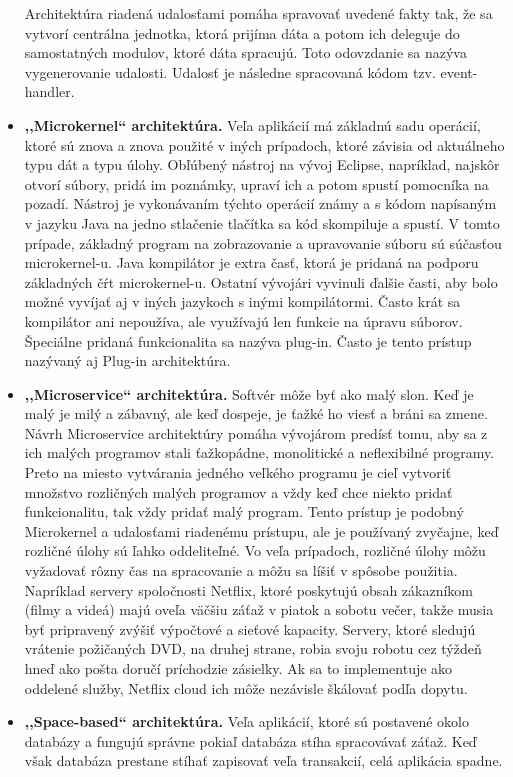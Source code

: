 \begin{itemize}
\indent Architektúra riadená udalosťami pomáha spravovať uvedené fakty tak, že sa vytvorí centrálna jednotka, ktorá prijíma dáta a potom ich deleguje do samostatných modulov, ktoré dáta spracujú. Toto odovzdanie sa nazýva vygenerovanie udalosti. Udalosť je následne spracovaná kódom tzv. event-handler.
 \item \textbf{ ,,Microkernel`` architektúra.} Veľa aplikácií má základnú sadu operácií, ktoré sú znova a znova použité v iných prípadoch, ktoré závisia od aktuálneho typu dát a typu úlohy. Obľúbený nástroj na vývoj Eclipse, napríklad, najskôr otvorí súbory, pridá im poznámky, upraví ich a potom spustí pomocníka na pozadí. Nástroj je vykonávaním týchto operácií známy a s kódom napísaným v jazyku Java na jedno stlačenie tlačítka sa kód skompiluje a spustí.
\indent V tomto prípade, základný program na zobrazovanie a upravovanie súboru sú súčasťou microkernel-u. Java kompilátor je extra časť, ktorá je pridaná na podporu základných čŕt microkernel-u. Ostatní vývojári vyvinuli ďalšie časti, aby bolo možné vyvíjať aj v iných jazykoch s inými kompilátormi. Často krát sa kompilátor ani nepoužíva, ale využívajú len funkcie na úpravu súborov. 
\indent Špeciálne pridaná funkcionalita sa nazýva plug-in. Často je tento prístup nazývaný aj Plug-in architektúra.
 \item \textbf{ ,,Microservice`` architektúra.} Softvér môže byť ako malý slon. Keď je malý je milý a zábavný, ale keď dospeje, je ťažké ho viesť a bráni sa zmene. Návrh Microservice architektúry pomáha vývojárom predísť tomu, aby sa z ich malých programov stali ťažkopádne, monolitické a neflexibilné programy. Preto na miesto vytvárania jedného veľkého programu je cieľ vytvoriť množstvo rozličných malých programov a vždy keď chce niekto pridať funkcionalitu, tak vždy pridať malý program.
\indent Tento prístup je podobný Microkernel 
a udalosťami riadenému prístupu, ale je používaný zvyčajne, keď rozličné úlohy sú ľahko oddeliteľné. Vo veľa prípadoch, rozličné úlohy môžu vyžadovať rôzny čas na spracovanie a môžu sa líšiť v spôsobe použitia. Napríklad servery spoločnosti Netflix, ktoré poskytujú obsah zákazníkom (filmy a videá) majú oveľa väčšiu záťaž v piatok a sobotu večer, takže musia byť pripravený zvýšiť výpočtové a sieťové kapacity. Servery, ktoré sledujú vrátenie požičaných DVD, na druhej strane, robia svoju robotu cez týždeň hneď ako pošta doručí príchodzie zásielky. Ak sa to implementuje ako oddelené služby, Netflix cloud ich môže nezávisle škálovať podľa dopytu.
 \item \textbf{ ,,Space-based`` architektúra.} Veľa aplikácií, ktoré sú postavené okolo databázy a fungujú správne pokiaľ databáza stíha spracovávať záťaž. Keď však databáza prestane stíhať zapisovať veľa transakcií, celá aplikácia spadne.

\end{itemize}
